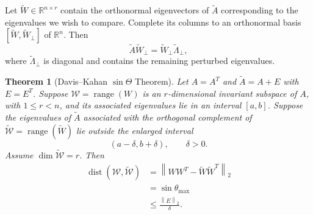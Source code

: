 \documentclass[14pt,letterpaper]{article}
\theoremstyle{plain}
\newtheorem{theorem}{Theorem}[section]
\theoremstyle{definition}
\theoremstyle{remark}
\newcommand{\R}{\mathbb{R}}
\newcommand{\norm}[1]{\left\lVert #1 \right\rVert}
\DeclareMathOperator{\range}{range}
\DeclareMathOperator{\dist}{dist}
\begin{document}
Let $\widetilde W\in\R^{n\times r}$ contain the
orthonormal eigenvectors of $\widetilde A$ corresponding
to the eigenvalues we wish to compare. Complete its
columns to an orthonormal basis
$[\widetilde W,\widetilde W_\perp]$ of $\R^n$.
Then
\[
\widetilde A\widetilde W_\perp
=\widetilde W_\perp\widetilde\Lambda_\perp,
\]
where $\widetilde\Lambda_\perp$ is diagonal and contains
the remaining perturbed eigenvalues.

\begin{theorem}[Davis--Kahan $\sin\Theta$ Theorem]
\label{thm:davis_kahan_interval}
Let $A=A^T$ and $\widetilde A=A+E$ with $E=E^T$.
Suppose $\mathcal W=\range(W)$ is an $r$-dimensional
invariant subspace of $A$, with $1\leq r<n$, and
its associated eigenvalues lie in an interval $[a,b]$.
Suppose the eigenvalues of $\widetilde A$ associated
with the orthogonal complement of
$\widetilde{\mathcal W}=\range(\widetilde W)$ lie
outside the enlarged interval
\[
(a-\delta,b+\delta),\qquad\delta>0.
\]
Assume $\dim\widetilde{\mathcal W}=r$. Then
\[
\boxed{
\begin{aligned}
\dist(\mathcal W,\widetilde{\mathcal W})
&=\norm{WW^T-\widetilde W\widetilde W^T}_2\\
&=\sin\theta_{\max}\\
&\leq\frac{\norm{E}_2}{\delta}.
\end{aligned}
}
\]
\end{theorem}
\end{document}
